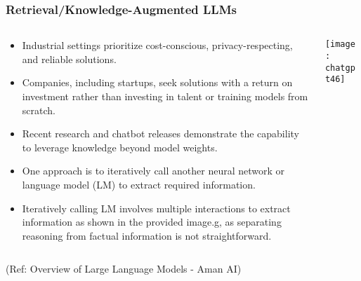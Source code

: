 \begin{frame}[fragile]\frametitle{Retrieval/Knowledge-Augmented LLMs}

\begin{columns}
    \begin{column}[T]{0.6\linewidth}
		\begin{itemize}
		\item Industrial settings prioritize cost-conscious, privacy-respecting, and reliable solutions.
		\item Companies, including startups, seek solutions with a return on investment rather than investing in talent or training models from scratch.
		\item Recent research and chatbot releases demonstrate the capability to leverage knowledge beyond model weights.
		\item One approach is to iteratively call another neural network or language model (LM) to extract required information.
		\item Iteratively calling LM involves multiple interactions to extract information as shown in the provided image.g, as separating reasoning from factual information is not straightforward.
		\end{itemize}
    \end{column}
    \begin{column}[T]{0.4\linewidth}
		\begin{center}
		\texttt{[image: chatgpt46]}
		\end{center}
    \end{column}
  \end{columns}
{\tiny (Ref: Overview of Large Language Models - Aman AI)}

\end{frame}

